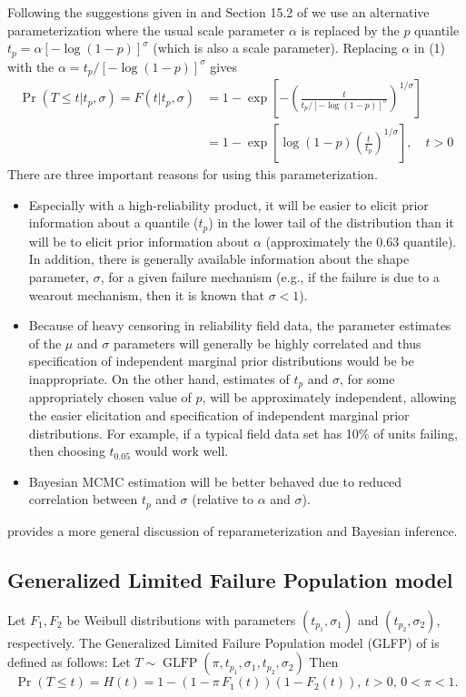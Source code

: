\documentclass[11pt]{article}
\newcommand{\op}{\operatorname}
\begin{document}
Following the suggestions given in \cite{LiMeeker2014} and Section 15.2 of \cite{intervals} we use an alternative parameterization
where the usual scale parameter $\alpha$ is replaced by the $p$ quantile $t_{p}=\alpha \left
[-\log(1-p)\right ]^{\sigma}$ (which is also a scale parameter). Replacing $\alpha$ in (1) with the
$\alpha=t_{p}/[-\log(1-p)]^{\sigma}$ gives
\begin{align*}
\nonumber
\Pr(T \leq t|t_{p},\sigma ) = F(t|t_{p},\sigma)&=1-
\exp \left [-\left (\frac{t}{t_{p}/[-\log(1-p)]^{\sigma}} \right )^{1/ \sigma}
\right ]\\
\label{equation:reparameterized.weibull.cdf}
&=1 - \exp\left[\log(1-p)\left(\frac{t}{t_{p}}\right)^{1/\sigma}\right], \quad t > 0
\end{align*}
There are three important reasons for using this parameterization.
\begin{itemize}
\item
Especially with a high-reliability product, it will be easier to
elicit prior information about a quantile  ($t_p$) in the lower tail of the
distribution than it will be to elicit prior information about
$\alpha$ (approximately the $0.63$ quantile). In addition, there is generally available
information about the shape parameter, $\sigma$, for a given failure
mechanism (e.g., if the failure is due to a wearout mechanism, then
it is known that $\sigma<1$). 
\item
Because of heavy censoring in reliability field data, the parameter
estimates of the $\mu$ and $\sigma$ parameters will generally be
highly correlated and thus specification of independent marginal
prior distributions would be be inappropriate. On the other hand,
estimates of $t_{p}$ and $\sigma$, for some appropriately chosen
value of $p$, will be approximately independent, allowing the easier
elicitation and specification of independent marginal prior
distributions. For example, if a typical field data set has 10\% of units
failing, then choosing $t_{0.05}$ would 
work well.
\item Bayesian MCMC estimation will be better behaved due to reduced correlation between $t_p$ and $\sigma$ (relative to $\alpha$ and $\sigma$).
\end{itemize}
 \cite{gelman2004parameterization} provides a more general discussion of reparameterization and Bayesian inference.

\subsection{Generalized Limited Failure Population model}
\label{subsec:GLFP model}
Let $F_1,F_2$ be Weibull distributions with parameters $(t_{p_1},\sigma_1)$ and $(t_{p_2}, \sigma_2)$, respectively.
The Generalized Limited Failure Population model (GLFP) of \citet{chan} is defined as follows: Let $T \sim \op{GLFP}(\pi, t_{p_1},\sigma_1,t_{p_2},\sigma_2)$ Then
$$\Pr(T \le t) = H(t) = 1 - (1-\pi\, F_{1}(t))(1 - F_{2}(t)),\, t>0,\, 0 < \pi < 1.$$
\end{document}
